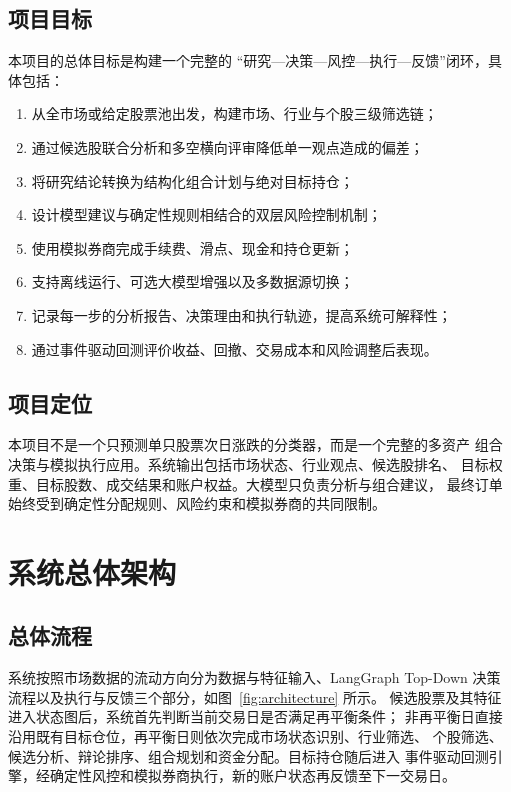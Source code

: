 \documentclass[a4paper,11pt]{article}
\begin{document}
\subsection{项目目标}

本项目的总体目标是构建一个完整的
``研究---决策---风控---执行---反馈''闭环，具体包括：

\begin{enumerate}
    \item 从全市场或给定股票池出发，构建市场、行业与个股三级筛选链；
    \item 通过候选股联合分析和多空横向评审降低单一观点造成的偏差；
    \item 将研究结论转换为结构化组合计划与绝对目标持仓；
    \item 设计模型建议与确定性规则相结合的双层风险控制机制；
    \item 使用模拟券商完成手续费、滑点、现金和持仓更新；
    \item 支持离线运行、可选大模型增强以及多数据源切换；
    \item 记录每一步的分析报告、决策理由和执行轨迹，提高系统可解释性；
    \item 通过事件驱动回测评价收益、回撤、交易成本和风险调整后表现。
\end{enumerate}

\subsection{项目定位}

本项目不是一个只预测单只股票次日涨跌的分类器，而是一个完整的多资产
组合决策与模拟执行应用。系统输出包括市场状态、行业观点、候选股排名、
目标权重、目标股数、成交结果和账户权益。大模型只负责分析与组合建议，
最终订单始终受到确定性分配规则、风险约束和模拟券商的共同限制。

\section{系统总体架构}

\subsection{总体流程}

系统按照市场数据的流动方向分为数据与特征输入、LangGraph Top-Down
决策流程以及执行与反馈三个部分，如图~\ref{fig:architecture} 所示。
候选股票及其特征进入状态图后，系统首先判断当前交易日是否满足再平衡条件；
非再平衡日直接沿用既有目标仓位，再平衡日则依次完成市场状态识别、行业筛选、
个股筛选、候选分析、辩论排序、组合规划和资金分配。目标持仓随后进入
事件驱动回测引擎，经确定性风控和模拟券商执行，新的账户状态再反馈至下一交易日。
\end{document}
